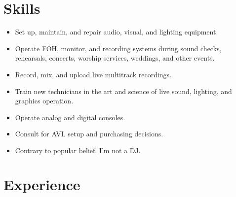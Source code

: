 \documentclass[12pt,sans,colorlinks,linkcolor=true]{moderncv}        %
\begin{document}
\hypersetup{urlcolor=links}
\makecvtitle

\section{Skills}

\begin{itemize}
\item Set up, maintain, and repair audio, visual, and lighting equipment.
\item Operate FOH, monitor, and recording systems during sound checks, rehearsals, concerts, worship services, weddings, and other events.
\item Record, mix, and upload live multitrack recordings.
\item Train new technicians in the art and science of live sound, lighting, and graphics operation.
\item Operate analog and digital consoles.
\item Consult for AVL setup and purchasing decisions.
\item Contrary to popular belief, I'm not a DJ.
\end{itemize}


\section{Experience}


\end{document}
